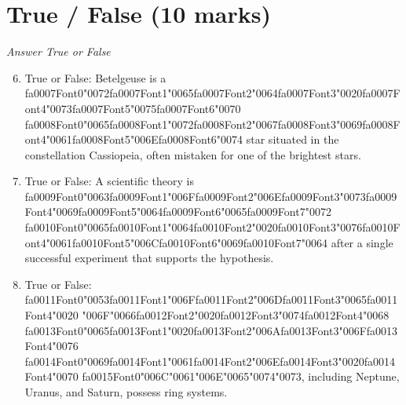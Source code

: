 \documentclass[12pt]{article}
\begin{document}
\section*{True / False (10 marks)}
\textit{Answer True or False}
\begin{enumerate}[label=\arabic*.]
\setcounter{enumi}{5}
\item True or False: Betelgeuse is a {\csname fa0007Font0\endcsname\char"0072}{\csname fa0007Font1\endcsname\char"0065}{\csname fa0007Font2\endcsname\char"0064}{\csname fa0007Font3\endcsname\char"0020}{\csname fa0007Font4\endcsname\char"0073}{\csname fa0007Font5\endcsname\char"0075}{\csname fa0007Font6\endcsname\char"0070} {\csname fa0008Font0\endcsname\char"0065}{\csname fa0008Font1\endcsname\char"0072}{\csname fa0008Font2\endcsname\char"0067}{\csname fa0008Font3\endcsname\char"0069}{\csname fa0008Font4\endcsname\char"0061}{\csname fa0008Font5\endcsname\char"006E}{\csname fa0008Font6\endcsname\char"0074} star situated in the constellation Cassiopeia, often mistaken for one of the brightest stars.
\item True or False: A scientific theory is {\csname fa0009Font0\endcsname\char"0063}{\csname fa0009Font1\endcsname\char"006F}{\csname fa0009Font2\endcsname\char"006E}{\csname fa0009Font3\endcsname\char"0073}{\csname fa0009Font4\endcsname\char"0069}{\csname fa0009Font5\endcsname\char"0064}{\csname fa0009Font6\endcsname\char"0065}{\csname fa0009Font7\endcsname\char"0072} {\csname fa0010Font0\endcsname\char"0065}{\csname fa0010Font1\endcsname\char"0064}{\csname fa0010Font2\endcsname\char"0020}{\csname fa0010Font3\endcsname\char"0076}{\csname fa0010Font4\endcsname\char"0061}{\csname fa0010Font5\endcsname\char"006C}{\csname fa0010Font6\endcsname\char"0069}{\csname fa0010Font7\endcsname\char"0064} after a single successful experiment that supports the hypothesis.
\item True or False: {\csname fa0011Font0\endcsname\char"0053}{\csname fa0011Font1\endcsname\char"006F}{\csname fa0011Font2\endcsname\char"006D}{\csname fa0011Font3\endcsname\char"0065}{\csname fa0011Font4\endcsname\char"0020} {\char"006F}{\char"0066}{\csname fa0012Font2\endcsname\char"0020}{\csname fa0012Font3\endcsname\char"0074}{\csname fa0012Font4\endcsname\char"0068} {\csname fa0013Font0\endcsname\char"0065}{\csname fa0013Font1\endcsname\char"0020}{\csname fa0013Font2\endcsname\char"006A}{\csname fa0013Font3\endcsname\char"006F}{\csname fa0013Font4\endcsname\char"0076} {\csname fa0014Font0\endcsname\char"0069}{\csname fa0014Font1\endcsname\char"0061}{\csname fa0014Font2\endcsname\char"006E}{\csname fa0014Font3\endcsname\char"0020}{\csname fa0014Font4\endcsname\char"0070} {\csname fa0015Font0\endcsname\char"006C}{\char"0061}{\char"006E}{\char"0065}{\char"0074}{\char"0073}, including Neptune, Uranus, and Saturn, possess ring systems.

\end{enumerate}
\end{document}
